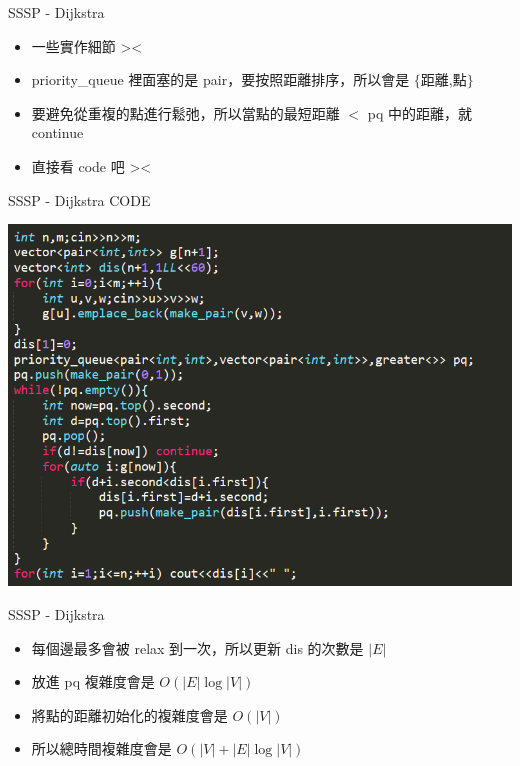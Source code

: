 \documentclass[aspectratio=169]{beamer}
\begin{document}
    \begin{frame}{SSSP - Dijkstra}
        \begin{itemize}
            \item 一些實作細節 ><
            \item priority\_queue 裡面塞的是 pair，要按照距離排序，所以會是 $\{$距離,點$\}$
            \item 要避免從重複的點進行鬆弛，所以當點的最短距離 $<$ pq 中的距離，就 continue 
            \item 直接看 code 吧 ><
        \end{itemize}
    \end{frame}
    
    \begin{frame}{SSSP - Dijkstra CODE}
        \begin{center}
            \includegraphics[scale=0.5]{code/dijkstra_code.png}
        \end{center}
    \end{frame}
    
    \begin{frame}{SSSP - Dijkstra}
        \begin{itemize}
            \item 每個邊最多會被 relax 到一次，所以更新 dis 的次數是 $|E|$
            \item 放進 pq 複雜度會是 $O(|E| \log |V|)$
            \item 將點的距離初始化的複雜度會是 $O(|V|)$
            \item 所以總時間複雜度會是 $O(|V| + |E| \log |V|)$
        \end{itemize}
    \end{frame}
    
\end{document}

